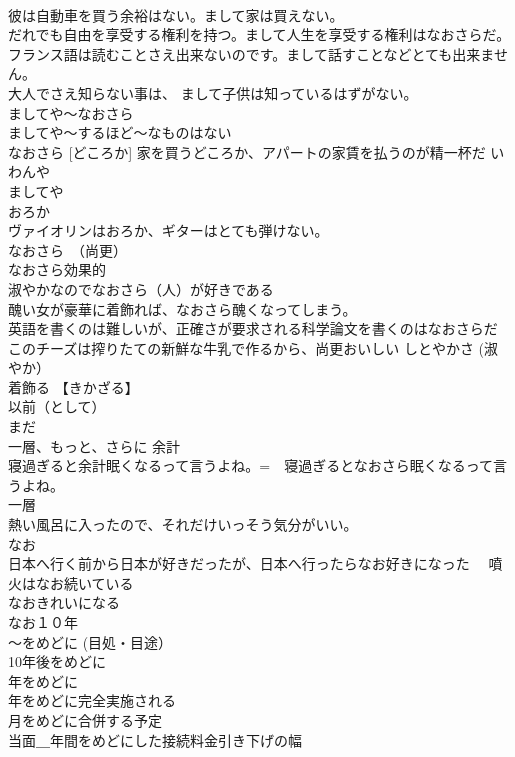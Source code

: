 \documentclass[8pt]{extreport}
\begin{document}
\begin{CJK}{UTF8}{min}
\\	彼は自動車を買う余裕はない。まして家は買えない。 
\\	だれでも自由を享受する権利を持つ。まして人生を享受する権利はなおさらだ。 
\\	フランス語は読むことさえ出来ないのです。まして話すことなどとても出来ません。 
\\	大人でさえ知らない事は、 まして子供は知っているはずがない。 
\\	ましてや～なおさら 
\\	ましてや～するほど～なものはない
\\	なおさら [どころか] 家を買うどころか、アパートの家賃を払うのが精一杯だ いわんや 
\\	ましてや 
\\	おろか 
\\	ヴァイオリンはおろか、ギターはとても弾けない。
\\	なおさら　（尚更）	
\\	なおさら効果的 
\\	淑やかなのでなおさら（人）が好きである 
\\	醜い女が豪華に着飾れば、なおさら醜くなってしまう。
\\	英語を書くのは難しいが、正確さが要求される科学論文を書くのはなおさらだ 
\\	このチーズは搾りたての新鮮な牛乳で作るから、尚更おいしい	しとやかさ (淑やか）
\\	着飾る 【きかざる】 
\\	以前（として） 
\\	まだ 
\\	一層、もっと、さらに	余計 
\\	寝過ぎると余計眠くなるって言うよね。=　寝過ぎるとなおさら眠くなるって言うよね。
\\	一層　
\\	熱い風呂に入ったので、それだけいっそう気分がいい。 
\\	なお 
\\	日本へ行く前から日本が好きだったが、日本へ行ったらなお好きになった 　噴火はなお続いている 
\\	なおきれいになる 
\\	なお１０年 
\\	～をめどに (目処・目途）	
\\	10年後をめどに 
\\	年をめどに 
\\	年をめどに完全実施される 
\\	月をめどに合併する予定 
\\	当面＿年間をめどにした接続料金引き下げの幅 

\end{CJK}
\end{document}
